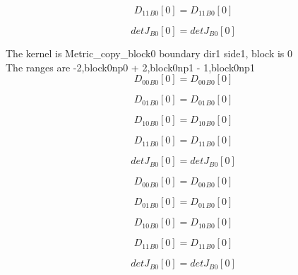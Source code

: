 \documentclass{article}
\begin{document}
\begin{dmath}{D_{11}{_{B0}}}[{0}] = {D_{11}{_{B0}}}[{0}]\end{dmath}

\begin{dmath}{detJ{_{B0}}}[{0}] = {detJ{_{B0}}}[{0}]\end{dmath}

\noindent The kernel is Metric_copy_block0 boundary dir1 side1, block is 0\\\noindent The ranges are -2,block0np0 + 2,block0np1 - 1,block0np1\\\begin{dmath}{D_{00}{_{B0}}}[{0}] = {D_{00}{_{B0}}}[{0}]\end{dmath}

\begin{dmath}{D_{01}{_{B0}}}[{0}] = {D_{01}{_{B0}}}[{0}]\end{dmath}

\begin{dmath}{D_{10}{_{B0}}}[{0}] = {D_{10}{_{B0}}}[{0}]\end{dmath}

\begin{dmath}{D_{11}{_{B0}}}[{0}] = {D_{11}{_{B0}}}[{0}]\end{dmath}

\begin{dmath}{detJ{_{B0}}}[{0}] = {detJ{_{B0}}}[{0}]\end{dmath}

\begin{dmath}{D_{00}{_{B0}}}[{0}] = {D_{00}{_{B0}}}[{0}]\end{dmath}

\begin{dmath}{D_{01}{_{B0}}}[{0}] = {D_{01}{_{B0}}}[{0}]\end{dmath}

\begin{dmath}{D_{10}{_{B0}}}[{0}] = {D_{10}{_{B0}}}[{0}]\end{dmath}

\begin{dmath}{D_{11}{_{B0}}}[{0}] = {D_{11}{_{B0}}}[{0}]\end{dmath}

\begin{dmath}{detJ{_{B0}}}[{0}] = {detJ{_{B0}}}[{0}]\end{dmath}
\end{document}
